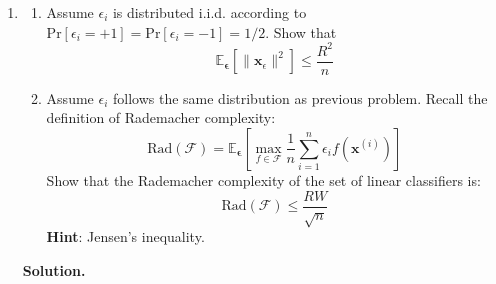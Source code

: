 \documentclass{article}
\newenvironment{Q}
        {%
          \clearpage
          \item
        }
        {%
          \phantom{s} %
          \bigskip
          \textbf{Solution.}
        }
\begin{document}
\begin{enumerate}[font={\Large\bfseries},left=0pt]
\begin{Q}
\begin{enumerate}
\begin{enumerate}
    \item Assume $\epsilon_i$ is distributed i.i.d. according to
    $\text{Pr}[\epsilon_i=+1] = \text{Pr}[\epsilon_i=-1] = 1/2$. Show that  $$\mathbb{E}_{\bm{\epsilon}}\left[\|\bm{x}_\epsilon\|^2\right] \leq \frac{R^2}{n}$$
    
    \item Assume  $\epsilon_i$ follows the same distribution as previous problem. Recall the definition of Rademacher complexity:
    $$
      \text{Rad}(\mathcal{F}) = \mathbb{E}_{\bm{\epsilon}} \left[ \max_{f\in\mathcal{F}}\frac{1}{n}\sum_{i=1}^{n}\epsilon_i f(\bm{x}^{(i)}) \right]
    $$
    Show that the Rademacher complexity of the set of linear classifiers is:
    $$\text{Rad}(\mathcal{F}) \leq \frac{RW}{\sqrt{n}}$$
    \textbf{Hint}: Jensen's inequality.
    \end{enumerate}
    
\end{enumerate}
\end{Q}
\begin{tcolorbox}

\end{tcolorbox}


    \end{enumerate}
\end{document}
